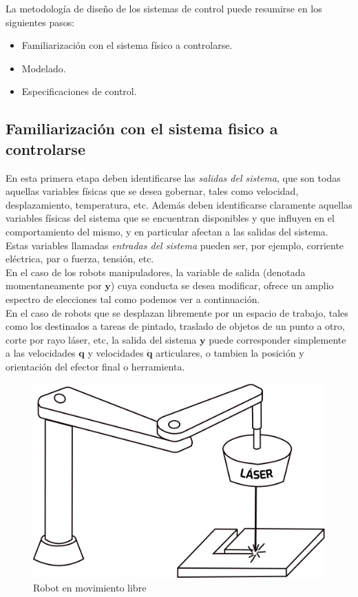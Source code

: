 La metodología de diseño de los sistemas de control puede resumirse en los siguientes pasos:

\begin{itemize}
	\item Familiarización con el sistema físico a controlarse.
	\item Modelado.
	\item Especificaciones de control.
\end{itemize}

\subsection{Familiarización con el sistema fisico a controlarse}

En esta primera etapa deben identificarse las \textit{salidas del sistema}, que son todas aquellas variables físicas que se desea gobernar, tales como velocidad, desplazamiento, temperatura, etc. Además deben identificarse claramente aquellas variables físicas del sistema que se encuentran disponibles y que influyen en el comportamiento del mismo, y en particular afectan a las salidas del sistema. Estas variables llamadas \textit{entradas del sistema} pueden ser, por ejemplo, corriente eléctrica, par o fuerza, tensión, etc.\\

En el caso de los robots manipuladores, la variable de salida (denotada momentaneamente por $\textbf{y}$) cuya conducta se desea modificar, ofrece un amplio espectro de elecciones tal como podemos ver a continuación.\\

En el caso de robots que se desplazan libremente por un espacio de trabajo, tales como los destinados a tareas de pintado, traslado de objetos de un punto a otro, corte por rayo láser, etc, la salida del sistema $\textbf{y}$ puede corresponder simplemente a las velocidades $\textbf{q}$ y velocidades $\dot{\textbf{q}}$ articulares, o tambien la posición y orientación del efector final o herramienta.\\

\begin{figure}[h!]
	\centering
	\includegraphics[scale=0.4]{Capitulo3/figs/robotLaser.png} 
	\caption{Robot en movimiento libre}
	\label{laser}
\end{figure}

